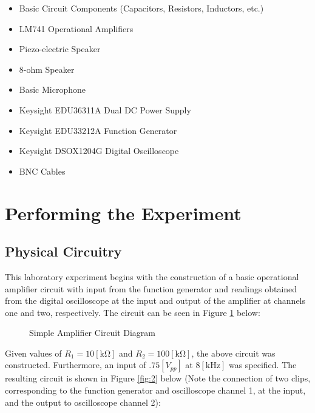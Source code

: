 \documentclass[
	letterpaper, %
	10pt, %
]{CSUniSchoolLabReport}
\begin{document}
\begin{itemize}

  \item Basic Circuit Components (Capacitors, Resistors, Inductors, etc.)

  \item LM741 Operational Amplifiers

  \item Piezo-electric Speaker

  \item 8-ohm Speaker

  \item Basic Microphone

  \item Keysight EDU36311A Dual DC Power Supply

  \item Keysight EDU33212A Function Generator

  \item Keysight DSOX1204G Digital Oscilloscope

  \item BNC Cables

\end{itemize}

\newpage

\section{Performing the Experiment}

\subsection{Physical Circuitry}\label{physical}

This laboratory experiment begins with the construction of a basic operational amplifier circuit with input from the function generator and readings obtained from the digital oscilloscope at the input and output of the amplifier at channels one and two, respectively. The circuit can be seen in Figure \ref{fig:1} below:

\begin{figure}[H]
  \centering
  
  \caption{Simple Amplifier Circuit Diagram}
  \label{fig:1}
\end{figure}

Given values of $R_1=10[\si{\kilo\ohm}]$ and $R_2=100[\si{\kilo\ohm}]$, the above circuit was constructed. Furthermore, an input of $.75[\si{V_{pp}}]$ at $8[\si{\kilo\hertz}]$ was specified. The resulting circuit is shown in Figure \ref{fig:2} below (Note the connection of two clips, corresponding to the function generator and oscilloscope channel 1, at the input, and the output to oscilloscope channel 2):
\end{document}
